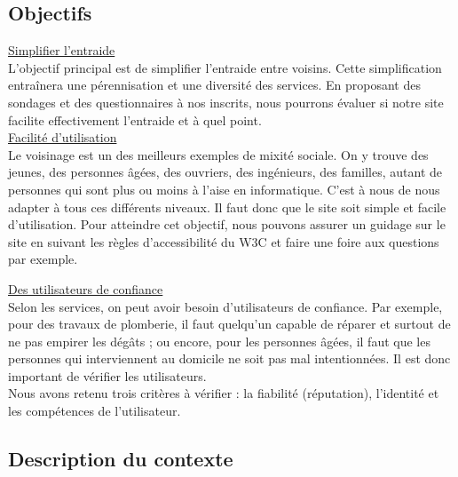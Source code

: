 \documentclass[a4paper,11pt]{article}
\begin{document}

\subsection{Objectifs}

\underline{Simplifier l'entraide}\\

L'objectif principal est de simplifier l'entraide entre voisins.
Cette simplification entraînera une pérennisation et une diversité des services.
En proposant des sondages et des questionnaires à nos inscrits, nous pourrons évaluer si notre site facilite effectivement l'entraide et à quel point.\\

\underline{Facilité d'utilisation}\\

Le voisinage est un des meilleurs exemples de mixité sociale.
On y trouve des jeunes, des personnes âgées, des ouvriers, des ingénieurs, des familles, autant de personnes qui sont plus ou moins à l'aise en informatique.
C'est à nous de nous adapter à tous ces différents niveaux. Il faut donc que le site soit simple et facile d'utilisation.
Pour atteindre cet objectif, nous pouvons assurer un guidage sur le site en suivant les règles d'accessibilité du W3C et faire une foire aux questions par exemple.\\

\pagebreak

\underline{Des utilisateurs de confiance}\\

Selon les services, on peut avoir besoin d'utilisateurs de confiance.
Par exemple, pour des travaux de plomberie, il faut quelqu'un capable de réparer et surtout de ne pas empirer les dégâts ; ou encore, pour les personnes âgées, il faut que les personnes qui interviennent au domicile ne soit pas mal intentionnées.
Il est donc important de vérifier les utilisateurs.\\
Nous avons retenu trois critères à vérifier : la fiabilité (réputation), l'identité et les compétences de l'utilisateur.\\



\subsection{Description du contexte}
\end{document}
